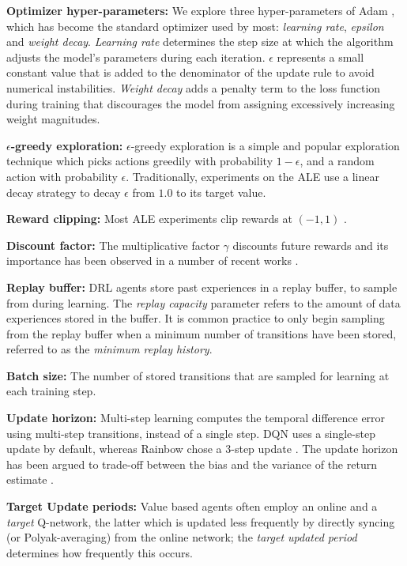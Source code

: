 \documentclass[10pt]{article} %
\begin{document}
{\bf Optimizer hyper-parameters: }
\label{sec:optimizerHypers}
We explore three hyper-parameters of Adam \citep{kingma15adam}, which has become the standard optimizer used by most: {\em learning rate}, {\em epsilon} and {\em weight decay}.
\emph{Learning rate} determines the step size at which the algorithm adjusts the model's parameters during each iteration.
$\epsilon$ represents a small constant value that is added to the denominator of the update rule to avoid numerical instabilities.
\emph{Weight decay} adds a penalty term to the loss function during training that discourages the model from assigning excessively increasing weight magnitudes.


{\bf $\epsilon$-greedy exploration: } 
$\epsilon$-greedy exploration is a simple and popular exploration technique which picks actions greedily with probability $1-\epsilon$, and a random action with probability $\epsilon$. Traditionally, experiments on the ALE use a linear decay strategy to decay $\epsilon$ from $1.0$ to its target value.

{\bf Reward clipping: } 
Most ALE experiments clip rewards at $(-1, 1)$ \citep{mnih2015humanlevel}.

{\bf Discount factor: } 
The multiplicative factor $\gamma$ discounts future rewards and its importance has been observed in a number of recent works \citep{amit2020discount, hessel19inductive, gelada2019off, vanseijen2019using, francoislavet2016discount,schwarzer23a}.

{\bf Replay buffer: }  
DRL agents  store past experiences in a replay buffer, to sample from during learning. The {\em replay capacity} parameter refers to the amount of data experiences stored in the buffer. 
It is common practice to only begin sampling from the replay buffer when a minimum number of transitions have been stored, referred to as the {\em minimum replay history}.


{\bf Batch size: } 
The number of stored transitions that are sampled for learning at each training step.

{\bf Update horizon: }
Multi-step learning \citep{sutton88learning} computes the temporal difference error using multi-step transitions, instead of a single step. DQN uses a single-step update by default, whereas Rainbow chose a 3-step update \citep{Hessel2018RainbowCI}. The update horizon has been argued to trade-off between the bias and the variance of the return estimate \citep{biasandvariance_kea}. 


{\bf Target Update periods: }
Value based agents often employ an online and a {\em target} Q-network, the latter which is updated less frequently by directly syncing (or Polyak-averaging) from the online network; the {\em target updated period} determines how frequently this occurs.
\end{document}
